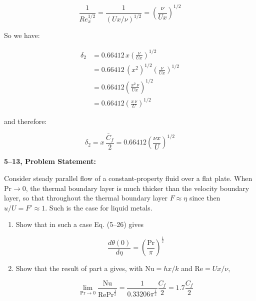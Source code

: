 \documentclass[letterpaper,12pt]{article}
\begin{document}
\begin{equation}
    \frac{1}{Re_x^{1/2}} = \frac{1}{(Ux/\nu)^{1/2}} = \left(\frac{\nu}{Ux}\right)^{1/2}
\end{equation}

So we have:

\begin{equation}
\begin{aligned}
    \delta_2 &= 0.66412\,x\left(\frac{\nu}{Ux}\right)^{1/2} \\
             &= 0.66412\,(x^2)^{1/2}\left(\frac{\nu}{Ux}\right)^{1/2} \\
             &= 0.66412\left(\frac{x^2\,\nu}{Ux}\right)^{1/2} \\
             &= 0.66412\left(\frac{x\,\nu}{U}\right)^{1/2}
\end{aligned}
\end{equation}

and therefore:

\begin{equation}
\boxed{
    \delta_2=x\,\frac{\bar C_f}{2}=0.66412\left(\frac{\nu x}{U}\right)^{1/2}
}
\end{equation}

\vspace{6pt}


\textbf{5--13, Problem Statement:}

Consider steady parallel flow of a constant-property fluid over a flat plate. When $\text{Pr} \to 0$, the thermal boundary layer is much thicker than the velocity boundary layer, so that throughout the thermal boundary layer $F \approx \eta$ since then $u / U = F' \approx 1$. Such is the case for liquid metals. 

\begin{enumerate}
    \item[(a)] Show that in such a case Eq. (5--26) gives
    
    \begin{equation}
        \frac{d \theta (0)}{d \eta} = \left( \frac{\text{Pr}}{\pi} \right)^{\frac{1}{2}}
    \end{equation}

    \item[(b)] Show that the result of part a gives, with $\text{Nu} = h x / k$ and $\text{Re} = U x / \nu$,
    
    \begin{equation}
        \lim_{\text{Pr} \to 0} \frac{\text{Nu}}{\text{Re}\text{Pr}^{\frac{1}{2}}} = \frac{1}{0.33206 \pi^{\frac{1}{2}}} \frac{C_f}{2} = 1.7 \frac{C_f}{2}
    \end{equation}

\end{enumerate}
\end{document}
